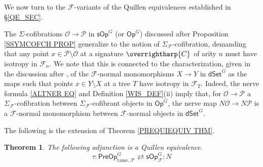 \documentclass[a4paper,10pt
,draft
]{article}%
\numberwithin{equation}{section}
\numberwithin{figure}{section}
\newtheorem{theorem}[equation]{Theorem}%
\theoremstyle{definition} %
\newcommand{\vect}[1]{\text{\overrightharp{\ensuremath{#1}}}}
\newcommand{\F}{\ensuremath{\mathcal F}}
\renewcommand{\O}{\ensuremath{\mathcal O}}
\newcommand{\1}{\ensuremath{\mathbbm 1}}%
\begin{document}


We now turn to the $\F$-variants of the Quillen equivalences established in
\S \ref{QE_SEC}. 

The $\Sigma$-cofibrations 
$\O \to \mathcal{P}$ in $\mathsf{sOp}^G$ (or $\mathsf{Op}^G$)
discussed after Proposition \ref{SSYMCOFCH PROP}
generalize to the notion of $\Sigma_\F$-cofibration,
demanding that any point 
$x \in \mathcal{P} \setminus \O$
at a signature $\vect{C}$
of arity $n$ must have isotropy in $\F_n$.
We note that this is connected to the characterization, 
given in the discussion after \cite[Def. 9.8]{Per18},
of the $\F$-normal monomorphisms $X\to Y$ in $\mathsf{dSet}^G$
as the maps such that points
$x \in Y\setminus X$ at a tree $T$ have isotropy in $\F_T$.
Indeed, the nerve formula \eqref{ALTNER EQ}
and Definition \ref{WIS_DEF}(ii)
imply that, for $\O \to \mathcal{P}$ a 
$\Sigma_{\F}$-cofibration between 
$\Sigma_{\F}$-cofibrant objects in $\mathsf{Op}^G$,
the nerve map
$N\O \to N\mathcal{P}$
is a $\F$-normal monomorphism between
$\F$-normal objects in $\mathsf{dSet}^G$.

The following is the extension of Theorem \ref{PREQUIEQUIV THM}.


\begin{theorem}\label{PREQUIEQUIVF THM}
	The following adjunction is a Quillen equivalence.
	\begin{equation}\label{PREQUIEQUIVF EQ}
	\tau \colon \mathsf{PreOp}^G_{\text{tame},\F}
	\rightleftarrows 
	\mathsf{sOp}^G_{\F} \colon N
	\end{equation}
\end{theorem}
\end{document}
